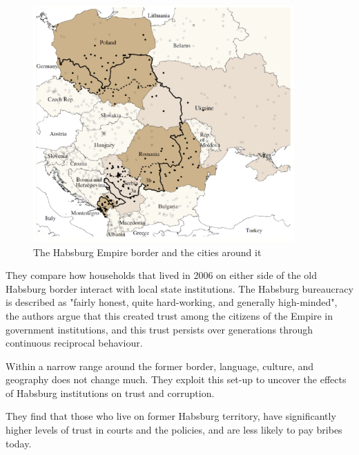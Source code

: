 \documentclass[11pt]{article}
\begin{document}
\begin{figure}[h]
    \centering
    \includegraphics[width=10cm]{photos/becker.png}
    \caption{The Habsburg Empire border and the cities around it}
    \label{fig:habsburg}
\end{figure}
\begin{mdframed}

They compare how households that lived in 2006 on either side of the old Habsburg border interact with local state institutions. The Habsburg bureaucracy is described as "fairly honest, quite hard-working, and generally high-minded", the authors argue that this created trust among the citizens of the Empire in government institutions, and this trust persists over generations through continuous reciprocal behaviour.

Within a narrow range around the former border, language, culture, and geography does not change much. They exploit this set-up to uncover the effects of Habsburg institutions on trust and corruption.

They find that those who live on former Habsburg territory, have significantly higher levels of trust in courts and the policies, and are less likely to pay bribes today.

\end{mdframed}

\newpage
\end{document}
